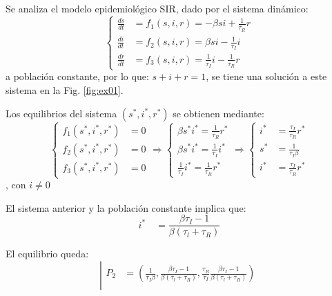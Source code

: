 \documentclass[twocolumn,aps,prl]{revtex4-1}
\begin{document}
Se analiza el modelo epidemiológico SIR, dado por el sistema dinámico:
$$
\left\lbrace
\begin{aligned}
\frac{d s}{d t} & = f_1(s,i,r) = -\beta s i+\frac{1}{\tau_{R}} r \\
\frac{d i}{d t} & = f_2(s,i,r) =\beta s i-\frac{1}{\tau_{I}} i \\
\frac{d r}{d t} & = f_3(s,i,r) =\frac{1}{\tau_{I}} i-\frac{1}{\tau_{R}} r
\end{aligned}
\right.
$$
a población constante, por lo que: $s+i+r =1 $, se tiene una solución a este sistema en la Fig. \ref{fig:ex01}.

Los equilibrios del sistema $\left(s^{*}, i^{*}, r^{*}\right)$ se obtienen mediante:
$$
\left\lbrace
\begin{aligned}
f_1(s^*, i^*, r^*) &= 0  \\
f_2(s^*, i^*, r^*) &= 0  \\
f_3(s^*, i^*, r^*) &= 0
\end{aligned}
\right.
\Rightarrow
\left\lbrace
\begin{aligned}
\beta s^* i^* = \frac{1}{\tau_{R}} r^* \\
\beta s^* i^* = \frac{1}{\tau_{I}} i^* \\
\frac{1}{\tau_{I}} i^* = \frac{1}{\tau_{R}} r^*
\end{aligned}
\right.
\Rightarrow
\left\lbrace
\begin{aligned}
i^* &= \frac{\tau_{I}}{\tau_{R}} r^* \\
s^* &= \frac{1}{\tau_{I} \beta}      \\
i^* &= \frac{\tau_{I}}{\tau_{R}} r^* 
\end{aligned}
\right.
$$
, con $i \neq 0$

El sistema anterior y la población constante implica que:
$$
i^{*} \quad=\frac{\beta \tau_{I}-1}{\beta\left(\tau_{l}+\tau_{R}\right)}
$$


El equilibrio queda:
$$
\left\lvert 
\begin{aligned}
    P_2 &= 
    ( \frac{1}{\tau_{I} \beta}  
    , \frac{\beta \tau_{I}-1}{\beta\left(\tau_{l}+\tau_{R}\right)}
    , \frac{\tau_{R}}{\tau_{I}} \frac{\beta \tau_{I}-1}{\beta\left(\tau_{l}+\tau_{R}\right)}
    ) \\ 
\end{aligned} \right.
$$
\end{document}
